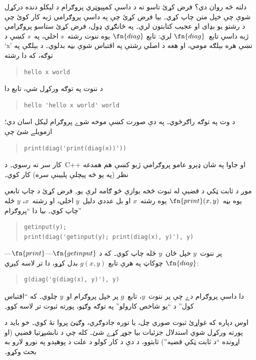 \documentclass[../../../include/open-logic-section]{subfiles}
\begin{document}
\begin{explain}
دلته څه روان دي؟ فرض کړئ تاسو ته د داسې کمپيوټري پروګرام د ليکلو
دنده درکړل شوې چې خپل متن چاپ کړي۔ بيا فرض کړئ چې په داسې پروګرامي
ژبه کار کوئ چې د رشتو يو بډای او عجيب کتابتون لري۔ په ځانګړي ډول،
فرض کړئ ستاسو پروګرامي ژبه داسې تابع~$\fn{diag}$ لري: تابع
$\fn{diag}$ يوه ننوت رشته~$s$ اخلي، په~$s$ کښې د `x' نښې هره بېلګه
مومي، او هغه د اصلي
رشتې په اقتباس شوې بڼه بدلوي۔ د بېلګې په توګه، که دا رشته
\begin{quote}
\begin{verbatim}
hello x world
\end{verbatim}
\end{quote}
د ننوت په توګه ورکړل شي، تابع دا
\begin{quote}
\begin{verbatim}
hello 'hello x world' world
\end{verbatim}
\end{quote}
د وت په توګه راګرځوي۔ په دې صورت کښې موخه شوے پروګرام ليکل اسان
دي؛ ازمويلے شئ چې
\begin{quote}
\begin{verbatim}
print(diag('print(diag(x))'))
\end{verbatim}
\end{quote}
کار سر ته رسوي۔ د~C++ او جاوا په شان ډېرو عامو پروګرامي ژبو کښې هم
همدغه نظر (په يو څه پېچلې پليينې سره) کار کوي۔

موږ د ثابت ټکي د قضيې له ثبوت څخه يوازې څو ګامه لرې يو۔ فرض کړئ د
چاپ تابعې يوه بڼه~$\fn{print}(x,y)$ يوه رشته~$x$ او بل عددي دليل~$y$
اخلي، او رشته~$x$، $y$ ځله چاپ کوي۔ بيا دا ``پروګرام''
\begin{quote}
\begin{verbatim}
getinput(y);
print(diag('getinput(y); print(diag(x), y)'), y)
\end{verbatim}
\end{quote}
پر ننوت~$y$ خپل ځان~$y$ ځله چاپ کوي۔ که د
$\fn{getinput}$---$\fn{print}$---$\fn{diag}$ چوکاټ په هرې تابع
$g(x,y)$ بدل کړو، دا تر لاسه کېږي:
\begin{quote}
\begin{verbatim}
g(diag('g(diag(x), y)'), y)
\end{verbatim}
\end{quote}
دا داسې پروګرام دے چې پر ننوت~$y$، تابع~$g$ پر خپل پروګرام او~$y$
چلوي۔ که ``اقتباس کول'' د ``يو شاخص کارولو'' په توګه وګڼو، پورته
ثبوت تر لاسه کوو۔

اوس دپاره که غواړئ ثبوت صوري چل، يا توره جادوګري، وګڼئ پروا نۀ کوي۔
خو بايد د پورته ورکړل شوي استدلال جزئيات بيا جوړ کړے شئ۔ کله چې د
نابشپړتيا قضيې (او اړونده ``د ثابت ټکي قضيه'') ثابتوو، د دې د کار
کولو د علت د پوهېدو په نورو لارو به بحث وکړو۔
\end{explain}
\end{document}
